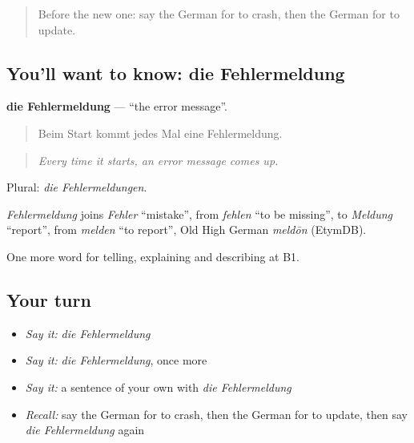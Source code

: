 \label{lesson:GE-C397-fehlermeldung}



\begin{quote}
Before the new one: say the German for to crash, then the German for to update.
\end{quote}

\subsection*{You'll want to know: die Fehlermeldung}
\textbf{die Fehlermeldung} — \textquotedblleft{}the error message\textquotedblright{}.

\begin{quote}
Beim Start kommt jedes Mal eine Fehlermeldung.
\end{quote}

\begin{quote}
\emph{Every time it starts, an error message comes up.}
\end{quote}

Plural: \emph{die Fehlermeldungen}.

\begin{cousinweb}
\emph{Fehlermeldung} joins \emph{Fehler} \textquotedblleft{}mistake\textquotedblright{}, from \emph{fehlen} \textquotedblleft{}to be missing\textquotedblright{}, to \emph{Meldung} \textquotedblleft{}report\textquotedblright{}, from \emph{melden} \textquotedblleft{}to report\textquotedblright{}, Old High German \emph{meldōn} (EtymDB).
\end{cousinweb}

\begin{grammarlens}[title={What you've built}]
One more word for telling, explaining and describing at B1.
\end{grammarlens}

\subsection*{Your turn}
\begin{itemize}
\raggedright
  \item \emph{Say it:} \emph{die Fehlermeldung}
  \item \emph{Say it:} \emph{die Fehlermeldung}, once more
  \item \emph{Say it:} a sentence of your own with \emph{die Fehlermeldung}
  \item \emph{Recall:} say the German for to crash, then the German for to update, then say \emph{die Fehlermeldung} again
\end{itemize}

